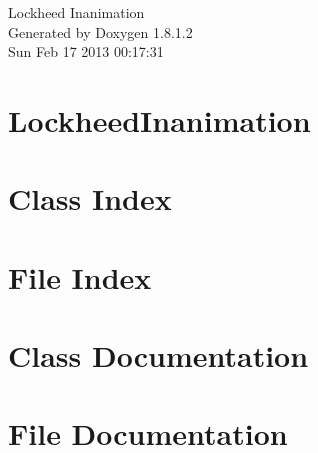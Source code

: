 \documentclass{book}
\begin{document}
\hypersetup{pageanchor=false,citecolor=blue}
\begin{titlepage}
\vspace*{7cm}
\begin{center}
{\Large Lockheed Inanimation }\\
\vspace*{1cm}
{\large Generated by Doxygen 1.8.1.2}\\
\vspace*{0.5cm}
{\small Sun Feb 17 2013 00:17:31}\\
\end{center}
\end{titlepage}
\clearemptydoublepage
{}
\tableofcontents
\clearemptydoublepage
{}
\hypersetup{pageanchor=true,citecolor=blue}
\chapter{Lockheed\-Inanimation}
\label{md_README}
\hypertarget{md_README}{}

\chapter{Class Index}

\chapter{File Index}

\chapter{Class Documentation}


\chapter{File Documentation}

\printindex
\end{document}
